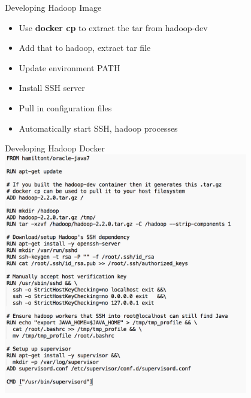 \documentclass[xcolor=dvipsnames]{beamer}
\newcommand{\cpause}{}
\begin{document}
\begin{frame}{Developing Hadoop Image}
  
  \vspace{-5mm}
  \begin{itemize}
    \item Use \textbf{docker cp} to extract the tar from hadoop-dev \cpause
    \item Add that to hadoop, extract tar file \cpause
    \item Update environment PATH \cpause
    \item Install SSH server \cpause
    \item Pull in configuration files
    \item Automatically start SSH, hadoop processes \cpause
  \end{itemize}

\end{frame}

\begin{frame}{Developing Hadoop Docker}
  \centering
  \includegraphics[width=0.8\textwidth]{figures/hadoop.png}
\end{frame}
\end{document}
